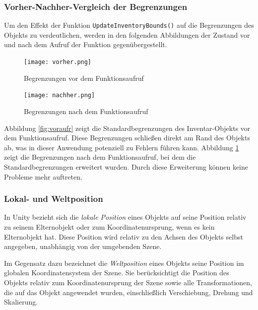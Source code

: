 \subsubsection*{Vorher-Nachher-Vergleich der Begrenzungen}
Um den Effekt der Funktion \texttt{UpdateInventoryBounds()} auf die Begrenzungen des Objekts zu verdeutlichen, werden in
den folgenden Abbildungen der Zustand vor und nach dem Aufruf der Funktion gegenübergestellt.

\begin{figure}[H]
    \centering
    \begin{minipage}[b]{0.45\textwidth}
        \centering
        \texttt{[image: vorher.png]}
        \caption{Begrenzungen vor dem Funktionsaufruf}
        \label{fig:voraufr}
    \end{minipage}
    \hfill
    \begin{minipage}[b]{0.45\textwidth}
        \centering
        \texttt{[image: nachher.png]}
        \caption{Begrenzungen nach dem Funktionsaufruf}
        \label{fig:nachaufr}
    \end{minipage}
\end{figure}

Abbildung \ref{fig:voraufr} zeigt die Standardbegrenzungen des Inventar-Objekts vor dem Funktionsaufruf. Diese Begrenzungen
schließen direkt am Rand des Objekts ab, was in dieser Anwendung potenziell zu Fehlern führen kann. Abbildung \ref{fig:nachaufr}
zeigt die Begrenzungen nach dem Funktionsaufruf, bei dem die Standardbegrenzungen erweitert wurden. Durch diese Erweiterung
können keine Probleme mehr auftreten.

\subsubsection*{Lokal- und Weltposition}
In Unity bezieht sich die \textit{lokale Position} eines Objekts auf seine Position relativ zu seinem Elternobjekt oder
zum Koordinatenursprung, wenn es kein Elternobjekt hat. Diese Position wird relativ zu den Achsen des Objekts selbst
angegeben, unabhängig von der umgebenden Szene.

Im Gegensatz dazu bezeichnet die \textit{Weltposition} eines Objekts seine Position im globalen Koordinatensystem der
Szene. Sie berücksichtigt die Position des Objekts relativ zum Koordinatenursprung der Szene sowie alle Transformationen,
die auf das Objekt angewendet wurden, einschließlich Verschiebung, Drehung und Skalierung.

